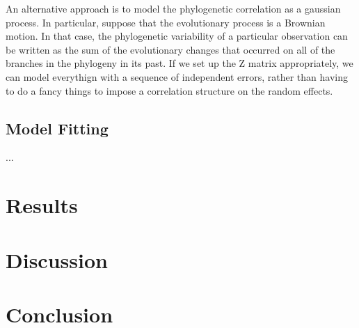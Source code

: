 \documentclass[12pt]{article}
\begin{document}
An alternative approach is to model the phylogenetic correlation as a gaussian process. 
In particular, suppose that the evolutionary process is a Brownian motion. 
In that case, the phylogenetic variability of a particular observation can be written as the sum of the evolutionary changes that occurred on all of the branches in the phylogeny in its past. 
If we set up the Z matrix appropriately, we can model everythign with a sequence of independent errors, rather than having to do a fancy things to impose a correlation structure on the random effects. 

\subsection{Model Fitting}

...


\section{Results}

\section{Discussion}

\section{Conclusion}
\end{document}
